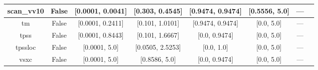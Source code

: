 \begin{tabular}{|c|c|c|c|c|c|c|l|}
   scan\_vv10 &                 False & [0.0001, 0.0041] &  [0.303, 0.4545] & [0.9474, 0.9474] &  [0.5556, 5.0] &        --- &                                                      \cite{Brandenburg2016_115144} \\ \hline
           tm &                 False & [0.0001, 0.2411] &  [0.101, 1.0101] & [0.9474, 0.9474] &     [0.0, 5.0] &        --- &                                                              \cite{Tao2016_073001} \\ \hline
         tpss &                 False & [0.0001, 0.8443] &  [0.101, 1.6667] &    [0.0, 0.9474] &     [0.0, 5.0] &        --- &                                              \cite{Tao2003_146401,Perdew2004_6898} \\ \hline
      tpssloc &                 False &    [0.0001, 5.0] & [0.0505, 2.5253] &       [0.0, 1.0] &     [0.0, 5.0] &        --- &                                                       \cite{Constantin2012_035130} \\ \hline
         vsxc &                 False &    [0.0001, 5.0] &    [0.8586, 5.0] &    [0.0, 0.9474] &     [0.0, 5.0] &        --- &                                                          \cite{VanVoorhis1998_400} \\ \hline
\end{tabular}